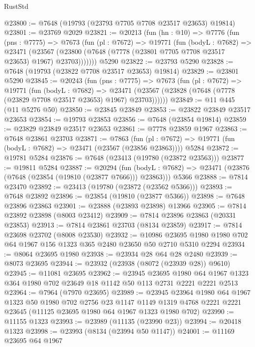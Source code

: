 \begin{lexlean}{RustStd}
\begin{coremodule}
{\begin{coremodule}
{{{{{{{{{{{{{{{{{{{{{{{{{{{{{{{{{{{{{{{{{{{{{{{{{{{{{@23800 := @7648 (@19793 (@23793 @7705 @7708 @23517 @23653) @19814)
@23801 := @23769 @2029
@23821 := @20213
    (fun (hn : @10) =>
    @7776
      (fun (pns : @7775) =>
      @7673
        (fun (pl : @7672) =>
        @19771
          (fun (bodyL : @7682) =>
          @23471
            (@23567 (@23800 (@7648 (@7778 (@23801 @7705 @7708 @23517 @23653) @1967) @23703)))))))
    @5290
@23822 := @23793 @5290
@23828 := @7648 (@19793 (@23822 @7708 @23517 @23653) @19814)
@23829 := @23801 @5290
@23845 := @20243
    (fun (pns : @7775) =>
    @7673
      (fun (pl : @7672) =>
      @19771
        (fun (bodyL : @7682) =>
        @23471 (@23567 (@23828 (@7648 (@7778 (@23829 @7708 @23517 @23653) @1967) @23703))))))
@23849 := @11 @445 (@11 @5276 @50)
@23850 := @23845 @23849
@23853 := @23822 @23849 @23517 @23653
@23854 := @19793 @23853
@23856 := @7648 (@23854 @19814)
@23859 := @23829 @23849 @23517 @23653
@23861 := @7778 @23859 @1967
@23863 := @7648 @23861 @23703
@23871 := @7863
    (fun (pl : @7672) => @19771 (fun (bodyL : @7682) => @23471 (@23567 (@23856 @23863))))
    @5284
@23872 := @19781 @5284
@23876 := @7648 (@23413 (@19780 (@23872 @23563)))
@23877 := @19811 @5284
@23887 := @20294
    (fun (bodyL : @7682) => @23471 (@23876 (@7648 (@23854 (@19810 (@23877 @7666))) @23863)))
    @5366
@23888 := @7814 @23470
@23892 := @23413 (@19780 (@23872 (@23562 @5366)))
@23893 := @7648 @23892
@23896 := @23854 (@19810 (@23877 @5366))
@23898 := @7648 @23896 @23863
@23901 := @23888 (@23893 @23898) @13966
@23905 := @7814 @23892 @23898 (@8003 @23412)
@23909 := @7814 @23896 @23863 (@20331 @23853)
@23913 := @7814 @23861 @23703 (@8134 @23859)
@23917 := @7814 @23698 @23702 (@8008 @23530)
@23932 := @10986
    @23695
    @1980
    @1980
    @702
    @64
    @1967
    @156
    @1323
    @365
    @2480
    @23650
    @50
    @2710
    @5310
    @2294
@23934 := @8064 @23695 @1980
@23938 := @23934 @28 @64 @28 @2480
@23939 := @8073 @23695
@23944 := @23932 (@23938 (@8072 (@23939 @28)) @9610)
@23945 := @11081 @23695
@23962 := @23945
    @23695
    @1980
    @64
    @1967
    @1323
    @364
    @1980
    @702
    @23649
    @18
    @1142
    @50
    @113
    @2731
    @2221
    @2221
    @2513
@23964 := @7964 (@7970 @23695)
@23989 := @23945
    @23964
    @1980
    @64
    @1967
    @1323
    @50
    @1980
    @702
    @2756
    @23
    @1147
    @1149
    @1319
    @4768
    @2221
    @2221
    @23645
    (@11125 @23695 @1980 @64 @1967 @1323 @1980 @702)
@23990 := @11155 @1323
@23993 := @23989 (@11135 (@23990 @23))
@23994 := @20418 @1323
@23998 := @23993 (@8134 (@23994 @50 @1147))
@24001 := @11169 @23695 @64 @1967
}}}}}}}}}}}}}}}}}}}}}}}}}}}}}}}}}}}}}}}}}}}}}}}}}}}}}
\end{coremodule}}
\end{coremodule}
\end{lexlean}
